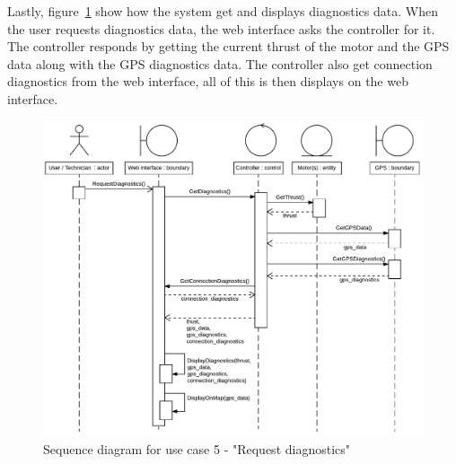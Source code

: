 Lastly, figure~\ref{fig:usecase5sd} show how the system get and displays diagnostics data. When the user requests diagnostics data, the web interface asks the controller for it. The controller responds by getting the current thrust of the motor and the GPS data along with the GPS diagnostics data. The controller also get connection diagnostics from the web interface, all of this is then displays on the web interface.

\begin{figure}[H]
\centering
\includegraphics[width=1\linewidth]{../Appendix/Project/Dokumentation/Images/System_architecture/Use_case_5_SD}
\caption{Sequence diagram for use case 5 - "Request diagnostics"}
\label{fig:usecase5sd}
\end{figure}











